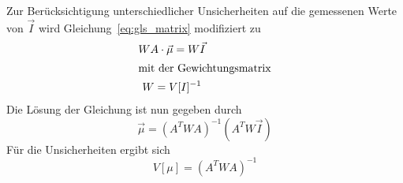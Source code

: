 Zur Berücksichtigung unterschiedlicher Unsicherheiten auf die gemessenen Werte
von $\vec{I}$ wird Gleichung~\eqref{eq:gls_matrix} modifiziert zu
\begin{gather}
  WA\cdot\vec{\mu}=W\vec{I} \\
  \intertext{mit der Gewichtungsmatrix}
  W=V[I]^{-1}
\end{gather}
Die Lösung der Gleichung ist nun gegeben durch
\begin{equation}
  \vec{\mu}=\left(A^TWA\right)^{-1}\left(A^TW\vec{I}\right)
\end{equation}
Für die Unsicherheiten ergibt sich
\begin{equation}
  V[\mu]=\left(A^TWA\right)^{-1}
\end{equation}
\cite{sample}
